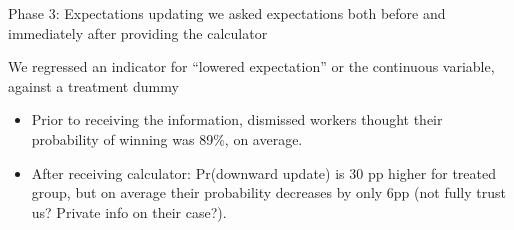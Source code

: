 \documentclass[9pt]{beamer}
\begin{document}
 
 \begin{frame}{Phase 3: Expectations updating}
 we asked  expectations both before and immediately after providing the calculator 
 \vspace{.1in}
 
 We regressed an indicator for ``lowered expectation'' or the continuous variable, against a treatment dummy
 
 
 \pause
 \vspace{.1in}
     \begin{table}[H]
    \begin{center}
        \scriptsize{}
        \end{center}
\end{table}

\vspace{.1in}

\begin{itemize}
    \item Prior to receiving the information, dismissed workers thought their probability of winning was 89\%, on average.
    \pause
    \item After receiving calculator:  Pr(downward update) is 30 pp higher for treated group, but on average their probability decreases by only 6pp (not fully trust us? Private info on their case?). 
\end{itemize}

 \end{frame}
 
 
\end{document}
